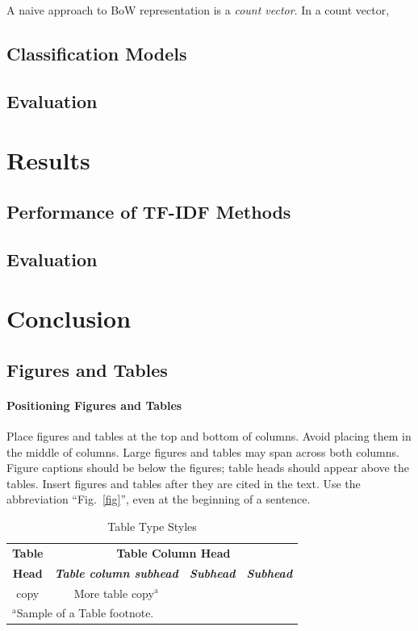 \documentclass[conference]{IEEEtran}
\begin{document}
A naive approach to BoW representation is a \textit{count vector}. In a count vector, 
\subsection{Classification Models}\label{AA}

\subsection{Evaluation}\label{AA}

\section{Results}
\subsection{Performance of TF-IDF Methods}\label{AA}
\subsection{Evaluation}\label{AA}


\section{Conclusion}

\subsection{Figures and Tables}
\paragraph{Positioning Figures and Tables} Place figures and tables at the top and 
bottom of columns. Avoid placing them in the middle of columns. Large 
figures and tables may span across both columns. Figure captions should be 
below the figures; table heads should appear above the tables. Insert 
figures and tables after they are cited in the text. Use the abbreviation 
``Fig.~\ref{fig}'', even at the beginning of a sentence.

\begin{table}[htbp]
\caption{Table Type Styles}
\begin{center}
\begin{tabular}{|c|c|c|c|}
\hline
\textbf{Table}&\multicolumn{3}{|c|}{\textbf{Table Column Head}} \\
\cline{2-4} 
\textbf{Head} & \textbf{\textit{Table column subhead}}& \textbf{\textit{Subhead}}& \textbf{\textit{Subhead}} \\
\hline
copy& More table copy$^{\mathrm{a}}$& &  \\
\hline
\multicolumn{4}{l}{$^{\mathrm{a}}$Sample of a Table footnote.}
\end{tabular}
\label{tab2}
\end{center}
\end{table}
\end{document}
